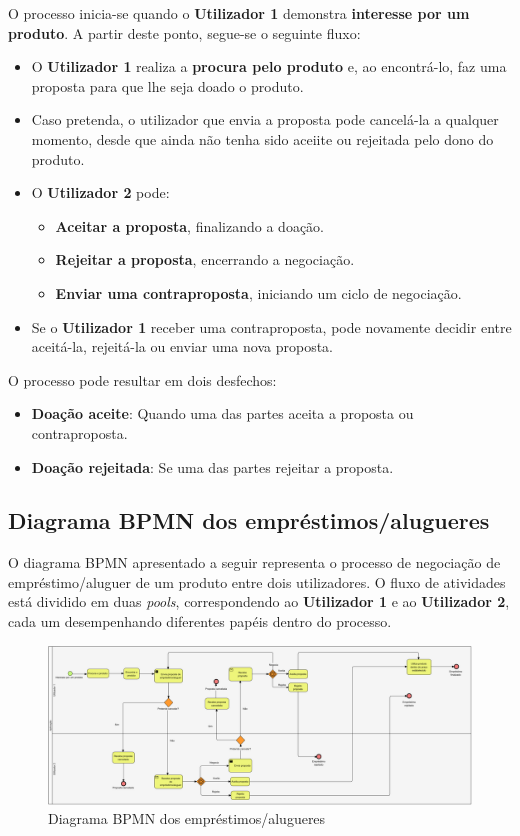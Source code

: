 \documentclass[a4paper, 12pt]{article} %
\begin{document}
O processo inicia-se quando o \textbf{Utilizador 1} demonstra \textbf{interesse por um produto}. A partir deste ponto, segue-se o seguinte fluxo:

\begin{itemize}
	\item O \textbf{Utilizador 1} realiza a \textbf{procura pelo produto} e, ao encontrá-lo, faz uma proposta para que lhe seja doado o produto.
	\item Caso pretenda, o utilizador que envia a proposta pode cancelá-la a qualquer momento, desde que ainda não tenha sido aceiite ou rejeitada pelo dono do produto.
	\item O \textbf{Utilizador 2} pode:
	\begin{itemize}
		\item \textbf{Aceitar a proposta}, finalizando a doação.
		\item \textbf{Rejeitar a proposta}, encerrando a negociação.
		\item \textbf{Enviar uma contraproposta}, iniciando um ciclo de negociação.
	\end{itemize}
	\item Se o \textbf{Utilizador 1} receber uma contraproposta, pode novamente decidir entre aceitá-la, rejeitá-la ou enviar uma nova proposta.
\end{itemize}


O processo pode resultar em dois desfechos:
\begin{itemize}
	\item \textbf{Doação aceite}: Quando uma das partes aceita a proposta ou contraproposta.
	\item \textbf{Doação rejeitada}: Se uma das partes rejeitar a proposta.
\end{itemize}

\subsection{Diagrama BPMN dos empréstimos/alugueres}

O diagrama BPMN apresentado a seguir representa o processo de negociação de empréstimo/aluguer de um produto entre dois utilizadores. O fluxo de atividades está dividido em duas \textit{pools}, correspondendo ao \textbf{Utilizador 1} e ao \textbf{Utilizador 2}, cada um desempenhando diferentes papéis dentro do processo. 

\begin{figure}[ht]
	\centering
	\includegraphics[width=\textwidth]{../images/bpmn-rentals.png}
	\caption{Diagrama BPMN dos empréstimos/alugueres}
	\label{fig:bpmn emprestimo/aluguer}
\end{figure}
\end{document}
